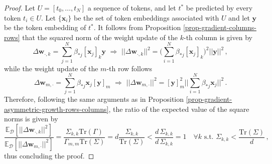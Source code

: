 \begin{proof}
%
Let $U = [t_0, \dots, t_N]$ a sequence of tokens, and let $t^*$ be predicted by every token $t_i \in U$. 
%
Let $\{\bm{x}_i\}$ be the set of token embeddings associated with $U$ and let $\bm{y}$ be the token embedding of $t^*$.
%
It follows from Proposition \ref{prop-gradient-columns-rows} that the squared norm of the weight update of the $k$-th column is given by 
%
\begin{equation}
\Delta \bm{w}_{\cdot, k} =  \sum_{j=1}^N \beta_{*j}[\bm{x}_j]_k\bm{y} 
%
\,\,\Rightarrow \,\,
%
||\Delta \bm{w}_{\cdot, k}||^2 = \big(\sum_{i=1}^N \beta_{*j}[\bm{x}_j]_k\big)^2 ||  \bm{y}||^2 \,,
\end{equation}
%
while the weight update of the $m$-th row follows
%
\begin{equation}
\Delta \bm{w}_{m, \cdot} = \sum_{j=1} ^N \beta_{*j} \bm{x}_j[\bm{y}]_m 
\,\,\Rightarrow \,\,
||\Delta \bm{w}_{m, \cdot}||^2 = [\bm{y}]^2_m || \sum_{i=1}^N \beta_{*j} \bm{x}_j||^2 \,.
\end{equation}
%
Therefore, following the same arguments as in Proposition \ref{prop-gradient-asymmetric-growth-rows-columns}, the ratio of the expected value of the square norms is given by
%
\begin{equation}
\frac{\mathbb{E}_{\mathcal{D}}\left[ ||\Delta \bm{w}_{\cdot, k}||^2 \right]}{\mathbb{E}_{\mathcal{D}}\left[ ||\Delta \bm{w}_{m, \cdot}||^2 \right]} = \frac{ \Sigma_{k,k}\text{Tr}(\Gamma)}{ \Gamma_{m,m}\text{Tr}(\Sigma)} = d\frac{\Sigma_{k,k}}{\text{Tr}(\Sigma)}  < \frac{d\,\Sigma_{k,k}}{d\,\Sigma_{k,k}} = 1 \quad \forall k \,\,\text{s.t.}\,\,\Sigma_{k,k} < \frac{\text{Tr}(\Sigma)}{d} \,,
\end{equation}
%
thus concluding the proof.
%
%
\end{proof}